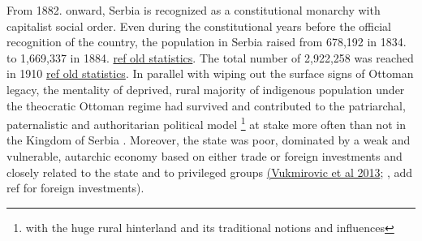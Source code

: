 \documentclass[11pt]{report}
\begin{document}
From 1882. onward, Serbia is recognized as a constitutional monarchy with capitalist social order. Even during the constitutional years before the official recognition of the country, the population in Serbia raised from 678,192 in 1834. to 1,669,337 in 1884. \href{}{ref old statistics}. The total number of 2,922,258 was reached in 1910 \href{}{ref old statistics}. 
In parallel with wiping out the surface signs of Ottoman legacy, the mentality of deprived, rural majority of indigenous population under the theocratic Ottoman regime had survived and contributed to the patriarchal, paternalistic and authoritarian political model
\footnote{with the huge rural hinterland and its traditional notions and influences}
at stake more often than not in the Kingdom of Serbia \href{}{\citealt{vukmirovic_city_2013}}. Moreover, the state was poor, dominated by a weak and vulnerable, autarchic economy based on either trade or foreign investments and closely related to the state and to privileged groups \href{}{(Vukmirovic et al 2013}; \href{Samardzic}{\citealt{doytchinov_belgrade_2015}}, add ref for foreign investments).
\\
\end{document}

